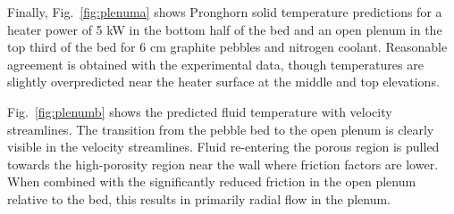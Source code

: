 Finally, Fig.\ \ref{fig:plenuma} shows Pronghorn solid temperature predictions for a heater power of 5 \si{\kilo\watt} in the bottom half of the bed and an open plenum in the top third of the bed for 6 \si{\centi\meter} graphite pebbles and nitrogen coolant. Reasonable agreement is obtained with the experimental data, though temperatures are slightly overpredicted near the heater surface at the middle and top elevations. 

Fig.\ \ref{fig:plenumb} shows the predicted fluid temperature with velocity streamlines. The transition from the pebble bed to the open plenum is clearly visible in the velocity streamlines. Fluid re-entering the porous region is pulled towards the high-porosity region near the wall where friction factors are lower. When combined with the significantly reduced friction in the open plenum relative to the bed, this results in primarily radial flow in the plenum.

